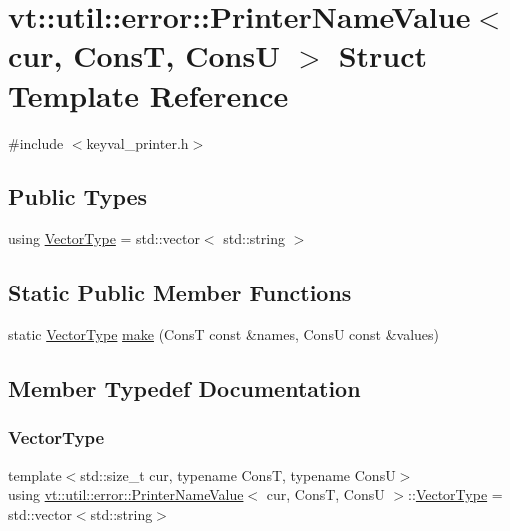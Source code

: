 \hypertarget{structvt_1_1util_1_1error_1_1_printer_name_value}{}\section{vt\+:\+:util\+:\+:error\+:\+:Printer\+Name\+Value$<$ cur, ConsT, ConsU $>$ Struct Template Reference}
\label{structvt_1_1util_1_1error_1_1_printer_name_value}


{\ttfamily \#include $<$keyval\+\_\+printer.\+h$>$}

\subsection*{Public Types}
\begin{DoxyCompactItemize}
\item 
using \hyperlink{structvt_1_1util_1_1error_1_1_printer_name_value_a9fa3936ec282d02e03775d8a7c098678}{Vector\+Type} = std\+::vector$<$ std\+::string $>$
\end{DoxyCompactItemize}
\subsection*{Static Public Member Functions}
\begin{DoxyCompactItemize}
\item 
static \hyperlink{structvt_1_1util_1_1error_1_1_printer_name_value_a9fa3936ec282d02e03775d8a7c098678}{Vector\+Type} \hyperlink{structvt_1_1util_1_1error_1_1_printer_name_value_ae17876bc298440df1aa7fc790823ff05}{make} (ConsT const \&names, ConsU const \&values)
\end{DoxyCompactItemize}


\subsection{Member Typedef Documentation}
\mbox{\label{structvt_1_1util_1_1error_1_1_printer_name_value_a9fa3936ec282d02e03775d8a7c098678}} 
\subsubsection{\texorpdfstring{Vector\+Type}{VectorType}}
{\footnotesize\ttfamily template$<$std\+::size\+\_\+t cur, typename ConsT, typename ConsU$>$ \\
using \hyperlink{structvt_1_1util_1_1error_1_1_printer_name_value}{vt\+::util\+::error\+::\+Printer\+Name\+Value}$<$ cur, ConsT, ConsU $>$\+::\hyperlink{structvt_1_1util_1_1error_1_1_printer_name_value_a9fa3936ec282d02e03775d8a7c098678}{Vector\+Type} =  std\+::vector$<$std\+::string$>$}




